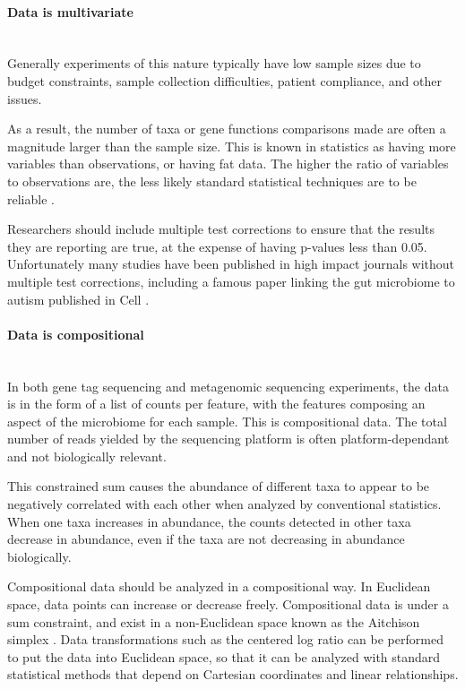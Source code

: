 \paragraph{Data is multivariate}\mbox{}\\
Generally experiments of this nature typically have low sample sizes due to budget constraints, sample collection difficulties, patient compliance, and other issues.

As a result, the number of taxa or gene functions comparisons made are often a magnitude larger than the sample size. This is known in statistics as having more variables than observations, or having fat data. The higher the ratio of variables to observations are, the less likely standard statistical techniques are to be reliable \cite{osborne2004sample}.

Researchers should include multiple test corrections to ensure that the results they are reporting are true, at the expense of having p-values less than 0.05. Unfortunately many studies have been published in high impact journals without multiple test corrections, including a famous paper linking the gut microbiome to autism published in Cell \cite{hsiao2013microbiota}.

\paragraph{Data is compositional}\mbox{}\\
In both gene tag sequencing and metagenomic sequencing experiments, the data is in the form of a list of counts per feature, with the features composing an aspect of the microbiome for each sample. This is compositional data. The total number of reads yielded by the sequencing platform is often platform-dependant and not biologically relevant.

This constrained sum causes the abundance of different taxa to appear to be negatively correlated with each other when analyzed by conventional statistics. When one taxa increases in abundance, the counts detected in other taxa decrease in abundance, even if the taxa are not decreasing in abundance biologically.

Compositional data should be analyzed in a compositional way. In Euclidean space, data points can increase or decrease freely. Compositional data is under a sum constraint, and exist in a non-Euclidean space known as the Aitchison simplex \cite{aitchison1982statistical}. Data transformations such as the centered log ratio can be performed to put the data into Euclidean space, so that it can be analyzed with standard statistical methods that depend on Cartesian coordinates and linear relationships.

